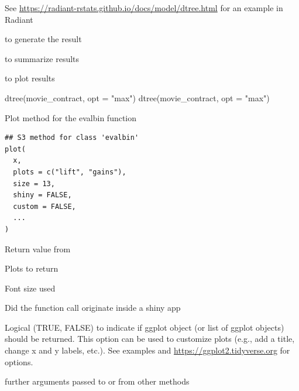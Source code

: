 \documentclass[a4paper]{book}
\begin{document}
%
\begin{Details}
See \url{https://radiant-rstats.github.io/docs/model/dtree.html} for an example in Radiant
\end{Details}
%
\begin{SeeAlso}
 to generate the result

 to summarize results

 to plot results
\end{SeeAlso}
%
\begin{Examples}
\begin{ExampleCode}
dtree(movie_contract, opt = "max") %
dtree(movie_contract, opt = "max") %

\end{ExampleCode}
\end{Examples}
%
\begin{Description}
Plot method for the evalbin function
\end{Description}
%
\begin{Usage}
\begin{verbatim}
## S3 method for class 'evalbin'
plot(
  x,
  plots = c("lift", "gains"),
  size = 13,
  shiny = FALSE,
  custom = FALSE,
  ...
)
\end{verbatim}
\end{Usage}
%
\begin{Arguments}
\begin{ldescription}
\item[\code{x}] Return value from 

\item[\code{plots}] Plots to return

\item[\code{size}] Font size used

\item[\code{shiny}] Did the function call originate inside a shiny app

\item[\code{custom}] Logical (TRUE, FALSE) to indicate if ggplot object (or list of ggplot objects) should be returned. This option can be used to customize plots (e.g., add a title, change x and y labels, etc.). See examples and \url{https://ggplot2.tidyverse.org} for options.

\item[\code{...}] further arguments passed to or from other methods
\end{ldescription}
\end{Arguments}
\end{document}
